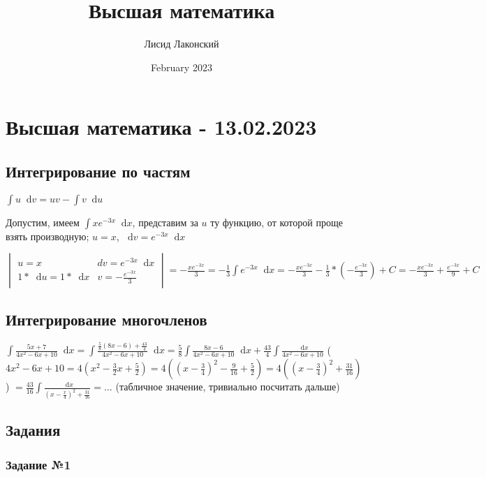 \documentclass{article}
\title{Высшая математика}
\author{Лисид Лаконский}
\date{February 2023}
\newcommand*\diff{\mathop{}\!\mathrm{d}}
\begin{document}
\raggedright

\maketitle

\tableofcontents
\pagebreak

\section{Высшая математика - 13.02.2023}

\subsection{Интегрирование по частям}

$\int u \diff v = u v - \int v \diff u$

Допустим, имеем $\int x e^{-3 x} \diff x$, представим за $u$ ту функцию, от которой проще взять производную; $u = x$, $\diff v = e^{- 3 x} \diff x$

$\begin{vmatrix}
    u = x & dv = e^{- 3 x} \diff x \\
    1 * \diff u = 1 * \diff x & v = - \frac{e^{- 3 x}}{3}
\end{vmatrix} = - \frac{x e^{- 3 x}}{3} = -\frac{1}{3} \int e^{- 3 x} \diff x = - \frac{x e^{-3 x}}{3} - \frac{1}{3} * (-\frac{e^{- 3 x}}{3}) + C = -\frac{x e^{- 3 x}}{3} + \frac{e^{- 3 x}}{9} + C$

\subsection{Интегрирование многочленов}

$
\int \frac{5 x + 7}{4x^2 - 6x + 10} \diff x = \int \frac{\frac{5}{8} (8x - 6) + \frac{43}{4}}{4x^2 - 6x + 10} \diff x = \frac{5}{8} \int \frac{8x - 6}{4x^2 - 6x + 10} \diff x + \frac{43}{4} \int \frac{\diff x}{4x^2 - 6x + 10}
$
($4x^2 - 6x + 10 = 4 (x^2 - \frac{3}{2} x + \frac{5}{2}) = 4((x - \frac{3}{4})^2 - \frac{9}{16} + \frac{5}{2}) = 4((x - \frac{3}{4})^2 + \frac{31}{16})$)
$
= \frac{43}{16} \int \frac{\diff x}{(x - \frac{x}{4})^2 + \frac{31}{16}} = \dots
$ (табличное значение, тривиально посчитать дальше)

\subsection{Задания}

\subsubsection{Задание №1}
\end{document}
